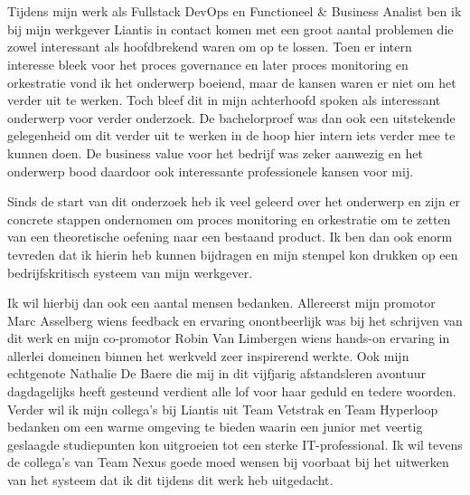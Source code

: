 
\chapter*{}%
\label{ch:voorwoord}
Tijdens mijn werk als Fullstack DevOps en Functioneel & Business Analist ben ik bij mijn werkgever Liantis in contact komen met een groot aantal problemen die zowel interessant als hoofdbrekend waren om op te lossen. Toen er intern interesse bleek voor het proces governance en later proces monitoring en orkestratie vond ik het onderwerp boeiend, maar de kansen waren er niet om het verder uit te werken. Toch bleef dit in mijn achterhoofd spoken als interessant onderwerp voor verder onderzoek. De bachelorproef was dan ook een uitstekende gelegenheid om dit verder uit te werken in de hoop hier intern iets verder mee te kunnen doen. De business value voor het bedrijf was zeker aanwezig en het onderwerp bood daardoor ook interessante professionele kansen voor mij. 

Sinds de start van dit onderzoek heb ik veel geleerd over het onderwerp en zijn er concrete stappen ondernomen om proces monitoring en orkestratie om te zetten van een theoretische oefening naar een bestaand product. Ik ben dan ook enorm tevreden dat ik hierin heb kunnen bijdragen en mijn stempel kon drukken op een bedrijfskritisch systeem van mijn werkgever.

Ik wil hierbij dan ook een aantal mensen bedanken. Allereerst mijn promotor Marc Asselberg wiens feedback en ervaring onontbeerlijk was bij het schrijven van dit werk en mijn co-promotor Robin Van Limbergen wiens hands-on ervaring in allerlei domeinen binnen het werkveld zeer inspirerend werkte. Ook mijn echtgenote Nathalie De Baere die mij in dit vijfjarig afstandsleren avontuur dagdagelijks heeft gesteund verdient alle lof voor haar geduld en tedere woorden. Verder wil ik mijn collega's bij Liantis uit Team Vetstrak en Team Hyperloop bedanken om een warme omgeving te bieden waarin een junior met veertig geslaagde studiepunten kon uitgroeien tot een sterke IT-professional. Ik wil tevens de collega's van Team Nexus goede moed wensen bij voorbaat bij het uitwerken van het systeem dat ik dit tijdens dit werk heb uitgedacht.    